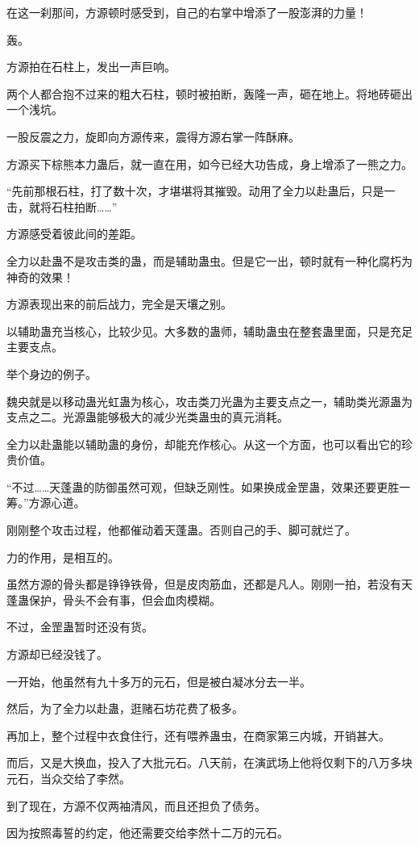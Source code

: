 \begin{this_body}
在这一刹那间，方源顿时感受到，自己的右掌中增添了一股澎湃的力量！

轰。

方源拍在石柱上，发出一声巨响。

两个人都合抱不过来的粗大石柱，顿时被拍断，轰隆一声，砸在地上。将地砖砸出一个浅坑。

一股反震之力，旋即向方源传来，震得方源右掌一阵酥麻。

方源买下棕熊本力蛊后，就一直在用，如今已经大功告成，身上增添了一熊之力。

“先前那根石柱，打了数十次，才堪堪将其摧毁。动用了全力以赴蛊后，只是一击，就将石柱拍断……”

方源感受着彼此间的差距。

全力以赴蛊不是攻击类的蛊，而是辅助蛊虫。但是它一出，顿时就有一种化腐朽为神奇的效果！

方源表现出来的前后战力，完全是天壤之别。

以辅助蛊充当核心，比较少见。大多数的蛊师，辅助蛊虫在整套蛊里面，只是充足主要支点。

举个身边的例子。

魏央就是以移动蛊光虹蛊为核心，攻击类刀光蛊为主要支点之一，辅助类光源蛊为支点之二。光源蛊能够极大的减少光类蛊虫的真元消耗。

全力以赴蛊能以辅助蛊的身份，却能充作核心。从这一个方面，也可以看出它的珍贵价值。

“不过……天蓬蛊的防御虽然可观，但缺乏刚性。如果换成金罡蛊，效果还要更胜一筹。”方源心道。

刚刚整个攻击过程，他都催动着天蓬蛊。否则自己的手、脚可就烂了。

力的作用，是相互的。

虽然方源的骨头都是铮铮铁骨，但是皮肉筋血，还都是凡人。刚刚一拍，若没有天蓬蛊保护，骨头不会有事，但会血肉模糊。

不过，金罡蛊暂时还没有货。

方源却已经没钱了。

一开始，他虽然有九十多万的元石，但是被白凝冰分去一半。

然后，为了全力以赴蛊，逛赌石坊花费了极多。

再加上，整个过程中衣食住行，还有喂养蛊虫，在商家第三内城，开销甚大。

而后，又是大换血，投入了大批元石。八天前，在演武场上他将仅剩下的八万多块元石，当众交给了李然。

到了现在，方源不仅两袖清风，而且还担负了债务。

因为按照毒誓的约定，他还需要交给李然十二万的元石。


\end{this_body}
